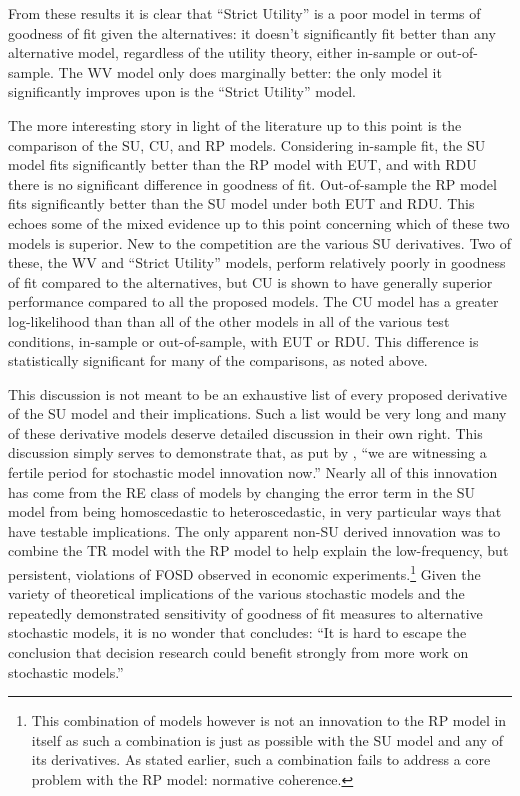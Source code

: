 \documentclass[../main.tex]{subfiles}
\begin{document}
From these results it is clear that \enquote{Strict Utility} is a poor model in terms of goodness of fit given the alternatives: it doesn't significantly fit better than any alternative model, regardless of the utility theory, either in-sample or out-of-sample.
The WV model only does marginally better: the only model it significantly improves upon is the \enquote{Strict Utility} model.

The more interesting story in light of the literature up to this point is the comparison of the SU, CU, and RP models.
Considering in-sample fit, the SU model fits significantly better than the RP model with EUT, and with RDU there is no significant difference in goodness of fit.
Out-of-sample the RP model fits  significantly better than the SU model under both EUT and RDU.
This echoes some of the mixed evidence up to this point concerning which of these two models is superior.
New to the competition are the various SU derivatives.
Two of these, the WV and \enquote{Strict Utility} models, perform relatively poorly in goodness of fit compared to the alternatives, but CU is shown to have generally superior performance compared to all the proposed models.
The CU model has a greater log-likelihood than than all of the other models in all of the various test conditions, in-sample or out-of-sample, with EUT or RDU.
This difference is statistically significant for many of the comparisons, as noted above.

This discussion is not meant to be an exhaustive list of every proposed derivative of the SU model and their implications.
Such a list would be very long and many of these derivative models deserve detailed discussion in their own right.
This discussion simply serves to demonstrate that, as put by \textcite[277]{Wilcox2008}, \enquote{we are witnessing a fertile period for stochastic model innovation now.}
Nearly all of this innovation has come from the RE class of models by changing the error term in the SU model from being homoscedastic to heteroscedastic, in very particular ways that have testable implications.
The only apparent non-SU derived innovation was to combine the TR model with the RP model to help explain the low-frequency, but persistent, violations of FOSD observed in economic experiments.\footnote{ This combination of models however is not an innovation to the RP model in itself as such a combination is just as possible with the SU model and any of its derivatives.
As stated earlier, such a combination fails to address a core problem with the RP model: normative coherence.} Given the variety of theoretical implications of the various stochastic models and the repeatedly demonstrated sensitivity of goodness of fit measures to alternative stochastic models, it is no wonder that \textcite[275]{Wilcox2008} concludes: \enquote{It is hard to escape the conclusion that decision research could benefit strongly from more work on stochastic models.}
\end{document}
